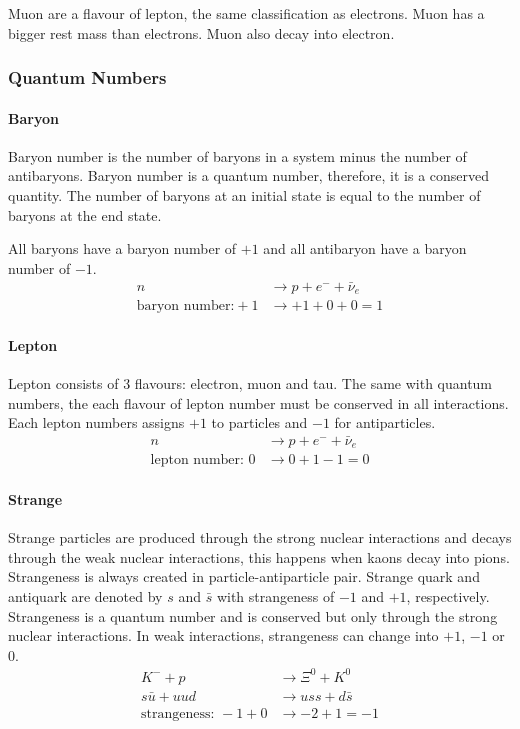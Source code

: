 \documentclass[10pt]{article}
\begin{document}
\begin{multicols*}{2}
	Muon are a flavour of lepton, the same classification as electrons. Muon has a
	bigger rest mass than electrons. Muon also decay into electron.

	\subsubsection{Quantum Numbers}
	\paragraph{Baryon}
	Baryon number is the number of baryons in a system minus the number of
	antibaryons. Baryon number is a quantum number, therefore, it is a conserved
	quantity. The number of baryons at an initial state is equal to the number of
	baryons at the end state.
	\medskip

	All baryons have a baryon number of $+1$ and all antibaryon have a baryon number
	of $-1$.
	\begin{align*}
		n                        & \longrightarrow p + e^- +\bar{\nu}_e \\
		\text{baryon number:} +1 & \longrightarrow +1 +0 +0 = 1
	\end{align*}

	\paragraph{Lepton}
	Lepton consists of 3 flavours: electron, muon and tau. The same with quantum
	numbers, the each flavour of lepton number must be conserved in all
	interactions. Each lepton numbers assigns $+1$ to particles and $-1$ for
	antiparticles.
	\begin{align*}
		n                        & \longrightarrow p + e^- +\bar{\nu}_e \\
		\text{lepton number: } 0 & \longrightarrow 0 + 1 - 1 = 0
	\end{align*}

	\paragraph{Strange}
	Strange particles are produced through the strong nuclear interactions and
	decays through the weak nuclear interactions, this happens when kaons
	decay into pions. Strangeness is always created in particle-antiparticle pair.
	Strange quark and antiquark are denoted by $s$ and $\bar{s}$ with strangeness of
	$-1$ and $+1$, respectively. Strangeness is a quantum number and is conserved
	but only through the strong nuclear interactions. In weak interactions,
	strangeness can change into $+1$, $-1$ or $0$.
	\begin{align*}
		K^- + p                     & \longrightarrow \Xi^0 + K^0    \\
		s\bar{u} + uud              & \longrightarrow uss + d\bar{s} \\
		\text{strangeness: } -1 + 0 & \longrightarrow -2 + 1 = -1
	\end{align*}


\end{multicols*}
\end{document}
